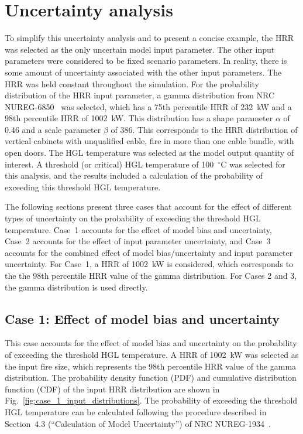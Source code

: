 \documentclass[12pt]{article}
\begin{document}
\section{Uncertainty analysis}
\label{sec:uncertainty_analysis}

 To simplify this uncertainty analysis and to present a concise example, the HRR was selected as the only uncertain model input parameter. The other input parameters were considered to be fixed scenario parameters. In reality, there is some amount of uncertainty associated with the other input parameters. The HRR was held constant throughout the simulation. For the probability distribution of the HRR input parameter, a gamma distribution from NRC NUREG-6850~\cite{NUREG_6850} was selected, which has a 75th percentile HRR of 232~kW and a 98th percentile HRR of 1002~kW. This distribution has a shape parameter $\alpha$ of 0.46 and a scale parameter $\beta$ of 386. This corresponds to the HRR distribution of vertical cabinets with unqualified cable, fire in more than one cable bundle, with open doors. The HGL temperature was selected as the model output quantity of interest. A threshold (or critical) HGL temperature of 100~$^\circ$C was selected for this analysis, and the results included a calculation of the probability of exceeding this threshold HGL temperature.

The following sections present three cases that account for the effect of different types of uncertainty on the probability of exceeding the threshold HGL temperature. Case~1 accounts for the effect of model bias and uncertainty, Case~2 accounts for the effect of input parameter uncertainty, and Case~3 accounts for the combined effect of model bias/uncertainty and input parameter uncertainty. For Case~1, a HRR of 1002~kW is considered, which corresponds to the the 98th percentile HRR value of the gamma distribution. For Cases 2 and 3, the gamma distribution is used directly.

\clearpage

\subsection{Case 1: Effect of model bias and uncertainty}

This case accounts for the effect of model bias and uncertainty on the probability of exceeding the threshold HGL temperature. A HRR of 1002~kW was selected as the input fire size, which represents the 98th percentile HRR value of the gamma distribution. The probability density function (PDF) and cumulative distribution function (CDF) of the input HRR distribution are shown in Fig.~\ref{fig:case_1_input_distributions}. The probability of exceeding the threshold HGL temperature can be calculated following the procedure described in Section~4.3 (``Calculation of Model Uncertainty'') of NRC NUREG-1934~\cite{NUREG_1934}.
\end{document}
